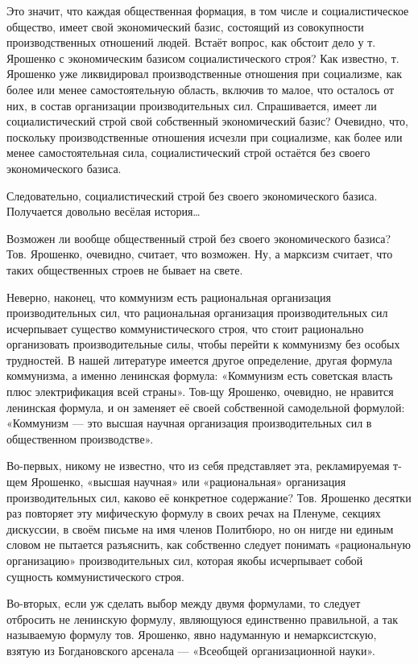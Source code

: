 \documentclass[12pt, a4paper, openany]{book}
\begin{document}
Это значит, что каждая общественная формация, в том числе и социалистическое общество, имеет свой экономический базис, состоящий из совокупности производственных отношений людей. Встаёт вопрос, как обстоит дело у т. Ярошенко с экономическим базисом социалистического строя? Как известно, т. Ярошенко уже ликвидировал производственные отношения при социализме, как более или менее самостоятельную область, включив то малое, что осталось от них, в состав организации производительных сил. Спрашивается, имеет ли социалистический строй свой собственный экономический базис? Очевидно, что, поскольку производственные отношения исчезли при социализме, как более или менее самостоятельная сила, социалистический строй остаётся без своего экономического базиса.

Следовательно, социалистический строй без своего экономического базиса. Получается довольно весёлая история…

Возможен ли вообще общественный строй без своего экономического базиса? Тов. Ярошенко, очевидно, считает, что возможен. Ну, а марксизм считает, что таких общественных строев не бывает на свете.

Неверно, наконец, что коммунизм есть рациональная организация производительных сил, что рациональная организация производительных сил исчерпывает существо коммунистического строя, что стоит рационально организовать производительные силы, чтобы перейти к коммунизму без особых трудностей. В нашей литературе имеется другое определение, другая формула коммунизма, а именно ленинская формула: «Коммунизм есть советская власть плюс электрификация всей страны». Тов-щу Ярошенко, очевидно, не нравится ленинская формула, и он заменяет её своей собственной самодельной формулой: «Коммунизм — это высшая научная организация производительных сил в общественном производстве».

Во-первых, никому не известно, что из себя представляет эта, рекламируемая т-щем Ярошенко, «высшая научная» или «рациональная» организация производительных сил, каково её конкретное содержание? Тов. Ярошенко десятки раз повторяет эту мифическую формулу в своих речах на Пленуме, секциях дискуссии, в своём письме на имя членов Политбюро, но он нигде ни единым словом не пытается разъяснить, как собственно следует понимать «рациональную организацию» производительных сил, которая якобы исчерпывает собой сущность коммунистического строя.

Во-вторых, если уж сделать выбор между двумя формулами, то следует отбросить не ленинскую формулу, являющуюся единственно правильной, а так называемую формулу тов. Ярошенко, явно надуманную и немарксистскую, взятую из Богдановского арсенала — «Всеобщей организационной науки».
\end{document}
